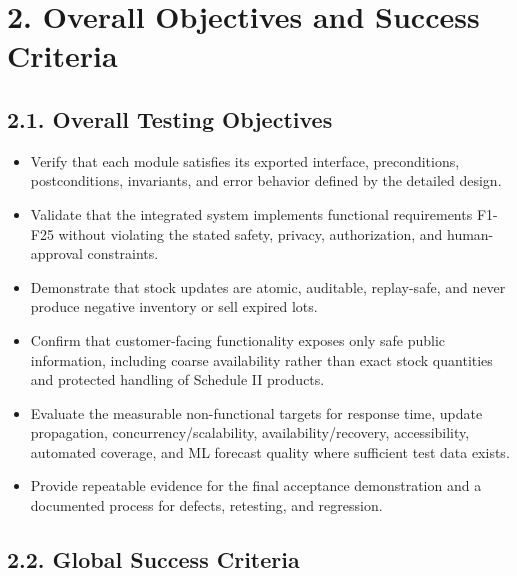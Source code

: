 \clearpage
\section{2. Overall Objectives and Success Criteria}\label{overall-objectives-and-success-criteria}

\subsection{2.1. Overall Testing Objectives}\label{overall-testing-objectives}

\begin{itemize}
\item
  Verify that each module satisfies its exported interface, preconditions, postconditions, invariants, and error behavior defined by the detailed design.
\item
  Validate that the integrated system implements functional requirements F1-F25 without violating the stated safety, privacy, authorization, and human-approval constraints.
\item
  Demonstrate that stock updates are atomic, auditable, replay-safe, and never produce negative inventory or sell expired lots.
\item
  Confirm that customer-facing functionality exposes only safe public information, including coarse availability rather than exact stock quantities and protected handling of Schedule II products.
\item
  Evaluate the measurable non-functional targets for response time, update propagation, concurrency/scalability, availability/recovery, accessibility, automated coverage, and ML forecast quality where sufficient test data exists.
\item
  Provide repeatable evidence for the final acceptance demonstration and a documented process for defects, retesting, and regression.
\end{itemize}

\subsection{2.2. Global Success Criteria}\label{global-success-criteria}

